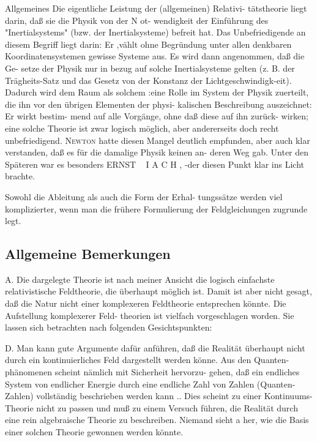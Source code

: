 Allgemeines
Die eigentliche Leistung der (allgemeinen) Relativi-
tätstheorie liegt darin, daß sie die Physik von der N ot-
wendigkeit der Einführung des "Inertialsystems" (bzw.
der Inertialsysteme) befreit hat. Das Unbefriedigende
an diesem Begriff liegt darin: Er ,vählt ohne Begründung
unter allen denkbaren Koordinatensystemen gewisse
Systeme aus. Es wird dann angenommen, daß die Ge-
setze der Physik nur in bezug auf solche Inertialsysteme
gelten (z. B. der Trägheits-Satz und das Gesetz von der
Konstanz der Lichtgeschwindigk-eit). Dadurch wird dem
Raum als solchem :eine Rolle im System der Physik
zuerteilt, die ihn vor den übrigen Elementen der physi-
kalischen Beschreibung auszeichnet: Er wirkt bestim-
mend auf alle Vorgänge, ohne daß diese auf ihn zurück-
wirken; eine solche Theorie ist zwar logisch möglich,
aber andererseits doch recht unbefriedigend. \textsc{Newton}
hatte diesen Mangel deutlich empfunden, aber auch klar
verstanden, daß es für die damalige Physik keinen an-
deren Weg gab. Unter den Späteren war es besonders
ERNST
~
I
A
C
H
,
-der diesen Punkt klar ins Licht brachte.

Sowohl die Ableitung als auch die Form der Erhal-
tungssätze werden viel komplizierter, wenn man die
frühere Formulierung der Feldgleichungen zugrunde
legt.

\subsection{Allgemeine Bemerkungen}


A. Die dargelegte Theorie ist nach meiner Ansicht
die logisch einfachste relativistische Feldtheorie, die
überhaupt möglich ist. Damit ist aber nicht gesagt,
daß die Natur nicht einer komplexeren Feldtheorie
entsprechen könnte. Die Aufstellung komplexerer Feld-
theorien ist vielfach vorgeschlagen worden. Sie lassen
sich betrachten nach folgenden Gesichtspunkten:

D. Man kann gute Argumente dafür anführen, daß
die Realität überhaupt nicht durch ein kontinuierliches
Feld dargestellt werden könne. Aus den Quanten-
phänomenen scheint nämlich mit Sicherheit hervorzu-
gehen, daß ein endliches System von endlicher Energie
durch eine endliche Zahl von Zahlen (Quanten-Zahlen)
vollständig beschrieben werden kann .. Dies scheint zu
einer Kontinuums-Theorie nicht zu passen und muß
zu einem Versuch führen, die Realität durch eine rein
algebraische Theorie zu beschreiben. Niemand sieht
a her, wie die Basis einer solchen Theorie gewonnen
werden könnte.